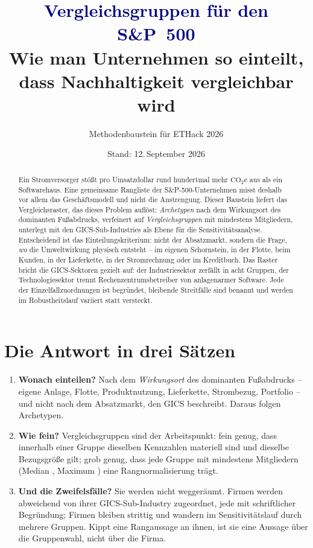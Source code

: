 \documentclass[11pt,a4paper]{article}
\title{\textcolor{navy}{Vergleichsgruppen für den S\&P~500}\\[3mm]
\large Wie man \NFirms{} Unternehmen so einteilt, dass Nachhaltigkeit vergleichbar wird}
\author{Methodenbaustein für ETHack 2026}
\date{Stand: 12.\,September 2026}
\newcommand{\coeq}{\ensuremath{\mathrm{CO}_{2}\mathrm{e}}}
\begin{document}
\maketitle

\begin{abstract}
Ein Stromversorger stößt pro Umsatzdollar rund hundertmal mehr \coeq{} aus als ein Softwarehaus. Eine gemeinsame Rangliste der \NFirms{} S\&P-500-Unternehmen misst deshalb vor allem das Geschäftsmodell und nicht die Anstrengung. Dieser Baustein liefert das Vergleichsraster, das dieses Problem auflöst: \NArchetypes{} \emph{Archetypen} nach dem Wirkungsort des dominanten Fußabdrucks, verfeinert auf \NGroups{} \emph{Vergleichsgruppen} mit mindestens \MinSize{} Mitgliedern, unterlegt mit den \NSubIndustries{} GICS-Sub-Industries als Ebene für die Sensitivitätsanalyse. Entscheidend ist das Einteilungskriterium: nicht der Absatzmarkt, sondern die Frage, \emph{wo} die Umweltwirkung physisch entsteht -- im eigenen Schornstein, in der Flotte, beim Kunden, in der Lieferkette, in der Stromrechnung oder im Kreditbuch. Das Raster bricht die GICS-Sektoren gezielt auf: der Industriesektor zerfällt in acht Gruppen, der Technologiesektor trennt Rechenzentrumsbetreiber von anlagenarmer Software. Jede der \NOverrides{} Einzelfallzuordnungen ist begründet, \NContested{} bleibende Streitfälle sind benannt und werden im Robustheitslauf variiert statt versteckt.
\end{abstract}

\tableofcontents
\newpage

\section{Die Antwort in drei Sätzen}

\begin{enumerate}
\item \textbf{Wonach einteilen?} Nach dem \emph{Wirkungsort} des dominanten Fußabdrucks -- eigene Anlage, Flotte, Produktnutzung, Lieferkette, Strombezug, Portfolio -- und nicht nach dem Absatzmarkt, den GICS beschreibt. Daraus folgen \NArchetypes{} Archetypen.
\item \textbf{Wie fein?} \NGroups{} Vergleichsgruppen sind der Arbeitspunkt: fein genug, dass innerhalb einer Gruppe dieselben Kennzahlen materiell sind und dieselbe Bezugsgröße gilt; grob genug, dass jede Gruppe mit mindestens \MinSize{} Mitgliedern (Median \MedGroup{}, Maximum \MaxGroup{}) eine Rangnormalisierung trägt.
\item \textbf{Und die Zweifelsfälle?} Sie werden nicht weggeräumt. \NOverrides{} Firmen werden abweichend von ihrer GICS-Sub-Industry zugeordnet, jede mit schriftlicher Begründung; \NContested{} Firmen bleiben strittig und wandern im Sensitivitätslauf durch mehrere Gruppen. Kippt eine Rangaussage an ihnen, ist sie eine Aussage über die Gruppenwahl, nicht über die Firma.
\end{enumerate}
\end{document}
